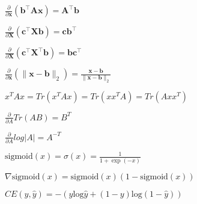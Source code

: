 \begin{inparaitem}[\color{red}\textbullet]
	\item $\frac{\partial}{\partial \mathbf{x}}(\mathbf{b}^\top \mathbf{A}\mathbf{x}) = \mathbf{A}^\top \mathbf{b}$
	\item $\frac{\partial}{\partial \mathbf{X}}(\mathbf{c}^\top \mathbf{X} \mathbf{b}) = \mathbf{c}\mathbf{b}^\top$ \\
	\item $\frac{\partial}{\partial \mathbf{X}}(\mathbf{c}^\top \mathbf{X}^\top \mathbf{b}) = \mathbf{b}\mathbf{c}^\top$
	\item $\frac{\partial}{\partial \mathbf{x}}(\| \mathbf{x}-\mathbf{b} \|_2) = \frac{\mathbf{x}-\mathbf{b}}{\|\mathbf{x}-\mathbf{b}\|_2}$ \\
	\item $x^T A x = Tr(x^T A x) = Tr(x x^T A) = Tr(A x x^T)$ \\
	\item $\tfrac{\partial}{\partial A} Tr(AB) {=} B^T$
	\item $\frac{\partial}{\partial A} log|A| {=} A^{-T}$ \\
	\item $\text{sigmoid}(x) = \sigma(x) = \frac{1}{1+\exp(-x)}$ \\
	\item $\nabla \text{sigmoid}(x) = \text{sigmoid}(x)(1-\text{sigmoid}(x))$
 \item $CE(y, \hat{y}) = -(y\text{log}\hat{y}+(1-y)\text{log}(1-\hat{y}))$
\end{inparaitem}

